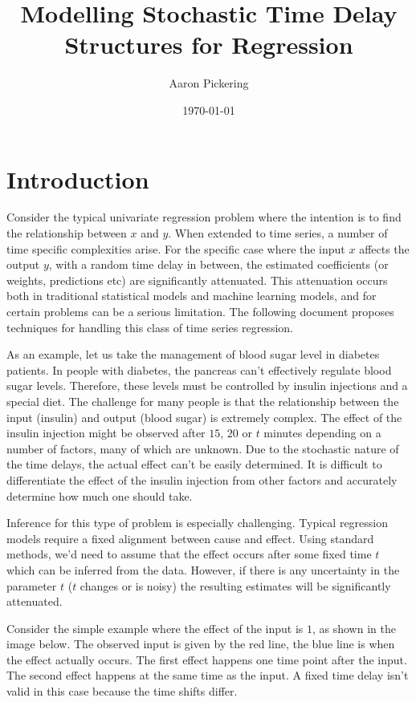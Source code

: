 \documentclass[11pt]{amsart}
\begin{document}
\title{Modelling Stochastic Time Delay Structures for Regression}
\author{Aaron Pickering}
\date{\today}
\maketitle

\section{Introduction}

Consider the typical univariate regression problem where the intention is to find the relationship between $x$ and $y$. When extended to time series, a number of time specific complexities arise. For the specific case where the input $x$ affects the output $y$, with a random time delay in between, the estimated coefficients (or weights, predictions etc) are significantly attenuated. This attenuation occurs both in traditional statistical models and machine learning models, and for certain problems can be a serious limitation. The following document proposes techniques for handling this class of time series regression.

As an example, let us take the management of blood sugar level in diabetes patients. In people with diabetes, the pancreas can't effectively regulate blood sugar levels. Therefore, these levels must be controlled by insulin injections and a special diet. The challenge for many people is that the relationship between the input (insulin) and output (blood sugar) is extremely complex. The effect of the insulin injection might be observed after $15$, $20$  or $t$ minutes depending on a number of factors, many of which are unknown. Due to the stochastic nature of the time delays, the actual effect can't be easily determined. It is difficult to differentiate the effect of the insulin injection from other factors and accurately determine how much one should take.

Inference for this type of problem is especially challenging. Typical regression models require a fixed alignment between cause and effect. Using standard methods, we'd need to assume that the effect occurs after some fixed time $t$ which can be inferred from the data. However, if there is any uncertainty in the parameter $t$ ($t$ changes or is noisy) the resulting estimates will be significantly attenuated.

Consider the simple example where the effect of the input is $1$, as shown in the image below. The observed input is given by the red line, the blue line is when the effect actually occurs. The first effect happens one time point after the input. The second effect happens at the same time as the input. A fixed time delay isn't valid in this case because the time shifts differ.
\end{document}
